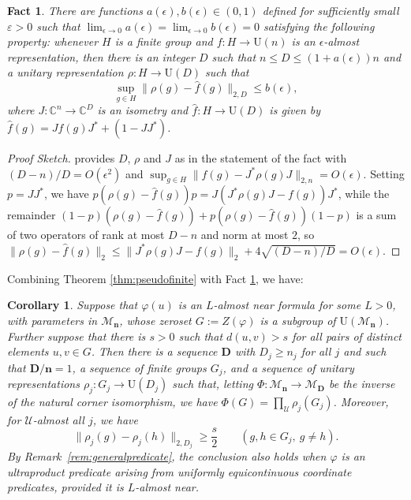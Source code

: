 \documentclass[12pt]{amsart}
\numberwithin{equation}{section}
\newtheorem{fact}[thm]{Fact}
\newtheorem{cor}[thm]{Corollary}
\theoremstyle{definition}
\newcommand{\C}{\mathbb{C}}
\def\cal{\mathcal}
\def\M{\mathcal{M}}
\newcommand\cU{{\cal U}}
\def \M{\mathcal{M}}
\begin{document}
\begin{fact}\label{fact:flexible}
There are functions $a(\epsilon),b(\epsilon)\in (0,1)$ defined for sufficiently small $\varepsilon>0$
such that $\lim_{\epsilon\to 0}a(\epsilon)=\lim_{\epsilon\to 0}b(\epsilon)=0$ satisfying the following property:  whenever $H$ is a finite group and $f:H\to \mathrm{U}(n)$ is an $\epsilon$-almost representation, then there is an integer $D$ such that $n\leq D\leq (1+a(\epsilon))n$ and a unitary representation $\rho:H\to \mathrm{U}(D)$ such that $$\sup_{g\in H}\|\rho(g)-\hat f(g)\|_{2,D}\leq b(\epsilon),$$ where $J:\C^n\to \C^D$ is an isometry and $\hat f:H\to \mathrm{U}(D)$ is given by $\hat f(g)=Jf(g)J^*+(1-JJ^*)$.
\end{fact}

\begin{proof}[Proof Sketch]
\cite[Theorem 1.6]{de2019operator} provides $D$, $\rho$ and $J$ as in the statement of the fact with $(D-n)/D=O(\epsilon^2)$ and
$\sup_{g\in H}\|f(g)-J^*\rho(g)J\|_{2,n}=O(\epsilon)$. Setting $p=JJ^*$, we have
$p(\rho(g)-\hat f(g))p=J(J^*\rho(g)J-f(g))J^*$, while the remainder
$(1-p)(\rho(g)-\hat f(g))+p(\rho(g)-\hat f(g))(1-p)$ is a sum of two
operators of rank at most $D-n$ and norm at most $2$, so
$\|\rho(g)-\hat f(g)\|_2\le\|J^*\rho(g)J-f(g)\|_2+4\sqrt{(D-n)/D}=O(\epsilon)$.
\end{proof}
Combining Theorem \ref{thm:pseudofinite} with Fact \ref{fact:flexible}, we have:

\begin{cor}\label{cor:pseudofinite}
Suppose that $\varphi(u)$ is an $L$-almost
near formula for some $L>0$, with parameters
in $\M_{\mathbf n}$, whose zeroset
$G:=Z(\varphi)$ is a subgroup of
$\mathrm U(\M_{\mathbf n})$.
Further suppose that there is $s>0$ such that $d(u,v)>s$ for all pairs of distinct elements $u,v\in G$.  Then there is a sequence $\mathbf{D}$ with $D_j\geq n_j$ for all $j$ and such that $\mathbf{D}/\mathbf{n}=1$, a sequence of finite groups $G_j$, and a sequence of unitary representations $\rho_j:G_j\to \mathrm{U}(D_j)$ such that, letting $\Phi:\M_{\mathbf{n}}\to \M_{\mathbf{D}}$ be the inverse of the natural corner isomorphism, we have $\Phi(G)=\prod_\cU \rho_j(G_j)$.
Moreover, for $\mathcal U$-almost all $j$,
we have
\begin{equation}
\|\rho_j(g)-\rho_j(h)\|_{2,D_j}
\ge \frac{s}{2}
\qquad
(g,h\in G_j,\ g\neq h).
\label{eq:rho-separation}
\end{equation}
By Remark~\ref{rem:generalpredicate}, the conclusion also holds when \(\varphi\) is an ultraproduct predicate arising from uniformly equicontinuous coordinate predicates, provided it is \(L\)-almost near.
\end{cor}
\end{document}
